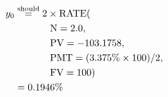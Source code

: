 \begin{align*}
y_{0}&\overset{\text{should}}{=}2\times\text{RATE}(\\
	&\hspace{.5in}\text{N}=2.0,\\
	&\hspace{.5in}\text{PV}=-103.1758,\\
	&\hspace{.5in}\text{PMT}=(3.375\%\times 100)/2,\\
	&\hspace{.5in}\text{FV}=100)\\
	&=0.1946\%
\end{align*}
